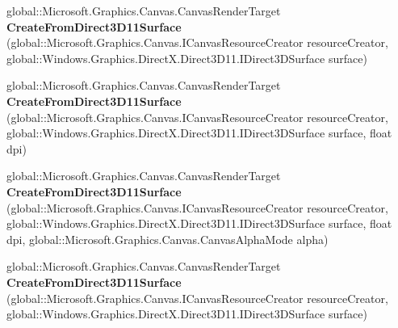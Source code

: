 \begin{DoxyCompactItemize}
\item 
\mbox{\label{interface_microsoft_1_1_graphics_1_1_canvas_1_1_i_canvas_render_target_statics_a2d0a325b04d1c79f55549238fdde4934}} 
global\+::\+Microsoft.\+Graphics.\+Canvas.\+Canvas\+Render\+Target {\bfseries Create\+From\+Direct3\+D11\+Surface} (global\+::\+Microsoft.\+Graphics.\+Canvas.\+I\+Canvas\+Resource\+Creator resource\+Creator, global\+::\+Windows.\+Graphics.\+Direct\+X.\+Direct3\+D11.\+I\+Direct3\+D\+Surface surface)
\item 
\mbox{\label{interface_microsoft_1_1_graphics_1_1_canvas_1_1_i_canvas_render_target_statics_a4edef1637b0e569998765e88f846b084}} 
global\+::\+Microsoft.\+Graphics.\+Canvas.\+Canvas\+Render\+Target {\bfseries Create\+From\+Direct3\+D11\+Surface} (global\+::\+Microsoft.\+Graphics.\+Canvas.\+I\+Canvas\+Resource\+Creator resource\+Creator, global\+::\+Windows.\+Graphics.\+Direct\+X.\+Direct3\+D11.\+I\+Direct3\+D\+Surface surface, float dpi)
\item 
\mbox{\label{interface_microsoft_1_1_graphics_1_1_canvas_1_1_i_canvas_render_target_statics_a8416b671ded635e82d95a7581e4d8d67}} 
global\+::\+Microsoft.\+Graphics.\+Canvas.\+Canvas\+Render\+Target {\bfseries Create\+From\+Direct3\+D11\+Surface} (global\+::\+Microsoft.\+Graphics.\+Canvas.\+I\+Canvas\+Resource\+Creator resource\+Creator, global\+::\+Windows.\+Graphics.\+Direct\+X.\+Direct3\+D11.\+I\+Direct3\+D\+Surface surface, float dpi, global\+::\+Microsoft.\+Graphics.\+Canvas.\+Canvas\+Alpha\+Mode alpha)
\item 
\mbox{\label{interface_microsoft_1_1_graphics_1_1_canvas_1_1_i_canvas_render_target_statics_a2d0a325b04d1c79f55549238fdde4934}} 
global\+::\+Microsoft.\+Graphics.\+Canvas.\+Canvas\+Render\+Target {\bfseries Create\+From\+Direct3\+D11\+Surface} (global\+::\+Microsoft.\+Graphics.\+Canvas.\+I\+Canvas\+Resource\+Creator resource\+Creator, global\+::\+Windows.\+Graphics.\+Direct\+X.\+Direct3\+D11.\+I\+Direct3\+D\+Surface surface)
\item 
\mbox{\label{interface_microsoft_1_1_graphics_1_1_canvas_1_1_i_canvas_render_target_statics_a4edef1637b0e569998765e88f846b084}} 

\end{DoxyCompactItemize}
